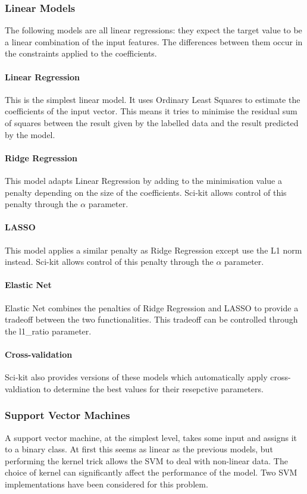 \subsubsection{Linear Models}
The following models are all linear regressions: they expect the target value to be a linear combination of the input features. The differences between them occur in the constraints applied to the coefficients.

\paragraph{Linear Regression}
This is the simplest linear model. It uses Ordinary Least Squares to estimate the coefficients of the input vector. This means it tries to minimise the residual sum of squares between the result given by the labelled data and the result predicted by the model.

\paragraph{Ridge Regression}
This model adapts Linear Regression by adding to the minimisation value a penalty depending on the size of the coefficients. Sci-kit allows control of this penalty through the $\alpha$ parameter.

\paragraph{LASSO}
This model applies a similar penalty as Ridge Regression except use the L1 norm instead. Sci-kit allows control of this penalty through the $\alpha$ parameter.

\paragraph{Elastic Net}
Elastic Net combines the penalties of Ridge Regression and LASSO to provide a tradeoff between the two functionalities. This tradeoff can be controlled through the l1\_ratio parameter.

\paragraph{Cross-validation}
Sci-kit also provides versions of these models which automatically apply cross-valdiation to determine the best values for their resepctive parameters.

\subsubsection{Support Vector Machines}
A support vector machine, at the simplest level, takes some input and assigns it to a binary class. At first this seems as linear as the previous models, but performing the kernel trick allows the SVM to deal with non-linear data. The choice of kernel can significantly affect the performance of the model. Two SVM implementations have been considered for this problem.

